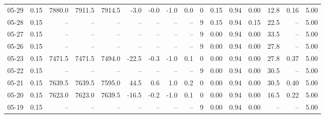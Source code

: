 \begin{threeparttable}
{\begin{tabular}{lrrrrrrrrrrrrrrr}
  05-29 &     0.15 & 7880.0 & 7911.5 & 7914.5 &       -3.0 &           -0.0 &                     -1.0 &                 0.0 &              0 &       0.15 &      0.94 &           0.00 &             12.8 &            0.16 &                   5.00 \\
  05-28 &     0.15 &     -- &     -- &     -- &         -- &             -- &                       -- &                  -- &              9 &       0.15 &      0.94 &           0.15 &             22.5 &              -- &                   5.00 \\
  05-27 &     0.15 &     -- &     -- &     -- &         -- &             -- &                       -- &                  -- &              9 &       0.00 &      0.94 &           0.00 &             33.5 &              -- &                   5.00 \\
  05-26 &     0.15 &     -- &     -- &     -- &         -- &             -- &                       -- &                  -- &              9 &       0.00 &      0.94 &           0.00 &             27.8 &              -- &                   5.00 \\
  05-23 &     0.15 & 7471.5 & 7471.5 & 7494.0 &      -22.5 &           -0.3 &                     -1.0 &                 0.1 &              0 &       0.00 &      0.94 &           0.00 &             27.8 &            0.37 &                   5.00 \\
  05-22 &     0.15 &     -- &     -- &     -- &         -- &             -- &                       -- &                  -- &              9 &       0.00 &      0.94 &           0.00 &             30.5 &              -- &                   5.00 \\
  05-21 &     0.15 & 7639.5 & 7639.5 & 7595.0 &       44.5 &            0.6 &                      1.0 &                 0.2 &              0 &       0.00 &      0.94 &           0.00 &             30.5 &            0.40 &                   5.00 \\
  05-20 &     0.15 & 7623.0 & 7623.0 & 7639.5 &      -16.5 &           -0.2 &                     -1.0 &                 0.1 &              0 &       0.00 &      0.94 &           0.00 &             16.5 &            0.22 &                   5.00 \\
  05-19 &     0.15 &     -- &     -- &     -- &         -- &             -- &                       -- &                  -- &              9 &       0.00 &      0.94 &           0.00 &               -- &              -- &                   5.00 \\

\end{tabular}}
\end{threeparttable}
